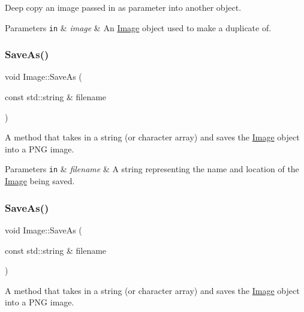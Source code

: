 Deep copy an image passed in as parameter into another object. 


\begin{DoxyParams}[1]{Parameters}
\mbox{\tt in}  & {\em image} & An \hyperlink{classImage}{Image} object used to make a duplicate of. \\
\hline
\end{DoxyParams}
\mbox{\label{classImage_afd027f3a969d6ff41c76a4ab2599d85d}} 
\subsubsection{\texorpdfstring{Save\+As()}{SaveAs()}\hspace{0.1cm}{\footnotesize\ttfamily [1/2]}}
{\footnotesize\ttfamily void Image\+::\+Save\+As (\begin{DoxyParamCaption}\item[{const std\+::string \&}]{filename }\end{DoxyParamCaption})}



A method that takes in a string (or character array) and saves the \hyperlink{classImage}{Image} object into a P\+NG image. 


\begin{DoxyParams}[1]{Parameters}
\mbox{\tt in}  & {\em filename} & A string representing the name and location of the \hyperlink{classImage}{Image} being saved. \\
\hline
\end{DoxyParams}
\mbox{\label{classImage_afd027f3a969d6ff41c76a4ab2599d85d}} 
\subsubsection{\texorpdfstring{Save\+As()}{SaveAs()}\hspace{0.1cm}{\footnotesize\ttfamily [2/2]}}
{\footnotesize\ttfamily void Image\+::\+Save\+As (\begin{DoxyParamCaption}\item[{const std\+::string \&}]{filename }\end{DoxyParamCaption})}



A method that takes in a string (or character array) and saves the \hyperlink{classImage}{Image} object into a P\+NG image. 


